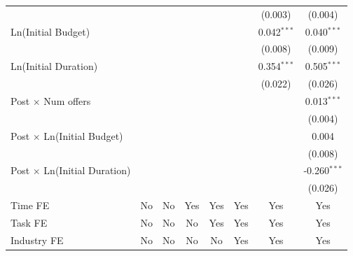 \documentclass[
]{article}
\begin{document}
\begin{table}[htbp]
\begin{tabular}{lccccccc}
                                          &                &                &                &               &               & (0.003)       & (0.004)\\   
      Ln(Initial Budget)                  &                &                &                &               &               & 0.042$^{***}$ & 0.040$^{***}$\\   
                                          &                &                &                &               &               & (0.008)       & (0.009)\\   
      Ln(Initial Duration)                &                &                &                &               &               & 0.354$^{***}$ & 0.505$^{***}$\\   
                                          &                &                &                &               &               & (0.022)       & (0.026)\\   
      Post $\times$ Num offers            &                &                &                &               &               &               & 0.013$^{***}$\\   
                                          &                &                &                &               &               &               & (0.004)\\   
      Post $\times$ Ln(Initial Budget)    &                &                &                &               &               &               & 0.004\\   
                                          &                &                &                &               &               &               & (0.008)\\   
      Post $\times$ Ln(Initial Duration)  &                &                &                &               &               &               & -0.260$^{***}$\\   
                                          &                &                &                &               &               &               & (0.026)\\   
      Time FE                             & No             & No             & Yes            & Yes           & Yes           & Yes           & Yes\\  
      Task FE                             & No             & No             & No             & Yes           & Yes           & Yes           & Yes\\  
      Industry FE                         & No             & No             & No             & No            & Yes           & Yes           & Yes\\  

\end{tabular}
\end{table}
\end{document}
